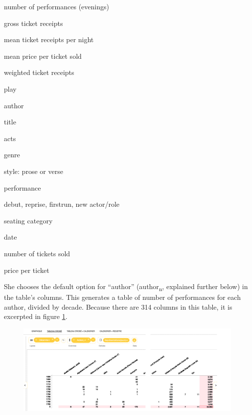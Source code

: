 \documentclass[	DIV=calc,%
							paper=a4,%
							fontsize=11pt,%
							twocolumn]{scrartcl}	 					%
\begin{document}
\begin{framefloat}[b]
	\fontsize{8pt}{8pt}\selectfont
  \begin{description}[noitemsep,align=left]

		\item[Measures]
			\item number of performances (evenings)
			\item gross ticket receipts
			\item mean ticket receipts per night
			\item mean price per ticket sold
			\item weighted ticket receipts

    \vspace{10pt}
		\item[Dimensions]
			\item play
			\item author
			\item title
			\item acts
			\item genre
			\item style: prose or verse
			\item performance
			\item debut, reprise, firstrun, new actor/role
			\item seating category

    \hrulefill
		\item[Facts]
			\item date
			\item number of tickets sold
			\item price per ticket
  \end{description}
\end{framefloat}

She chooses the default option for ``author'' (author\textsubscript{n}, explained further below) in the table’s columns.  This generates a table of number of performances for each author, divided by decade.  Because there are 314 columns in this table, it is excerpted in figure \ref{fig:stitched-author-table}.

\begin{figure}
  \centering
	\includegraphics[width=7in]{steps/stitched-author-table.png}
	\caption{}
	\label{fig:stitched-author-table}
\end{figure}
\end{document}
